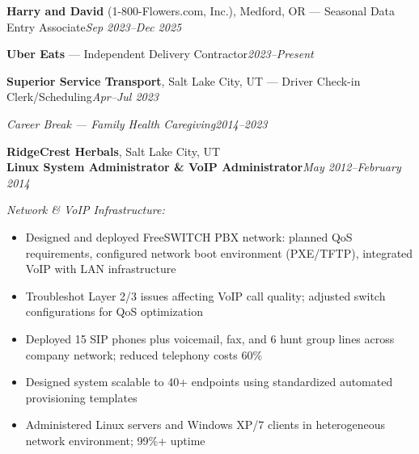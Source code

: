 \documentclass[9pt,letterpaper]{extarticle}
\begin{document}
\vspace{3pt}
\noindent\textbf{Harry and David} (1-800-Flowers.com, Inc.), Medford, OR --- Seasonal Data Entry Associate\hfill\textit{Sep 2023--Dec 2025}

\vspace{3pt}
\noindent\textbf{Uber Eats} --- Independent Delivery Contractor\hfill\textit{2023--Present}

\vspace{3pt}
\noindent\textbf{Superior Service Transport}, Salt Lake City, UT --- Driver Check-in Clerk/Scheduling\hfill\textit{Apr--Jul 2023}

\vspace{3pt}
\noindent\textit{Career Break --- Family Health Caregiving}\hfill\textit{2014--2023}

\vspace{5pt}
\noindent\textbf{RidgeCrest Herbals}, Salt Lake City, UT\\
\textbf{Linux System Administrator \& VoIP Administrator}\hfill\textit{May 2012--February 2014}

\smallskip\textit{Network \& VoIP Infrastructure:}
\begin{itemize}
  \item Designed and deployed FreeSWITCH PBX network: planned QoS requirements, configured network boot environment (PXE/TFTP), integrated VoIP with LAN infrastructure
  \item Troubleshot Layer 2/3 issues affecting VoIP call quality; adjusted switch configurations for QoS optimization
  \item Deployed 15 SIP phones plus voicemail, fax, and 6 hunt group lines across company network; reduced telephony costs 60\%
  \item Designed system scalable to 40+ endpoints using standardized automated provisioning templates
  \item Administered Linux servers and Windows XP/7 clients in heterogeneous network environment; 99\%+ uptime
\end{itemize}
\end{document}
